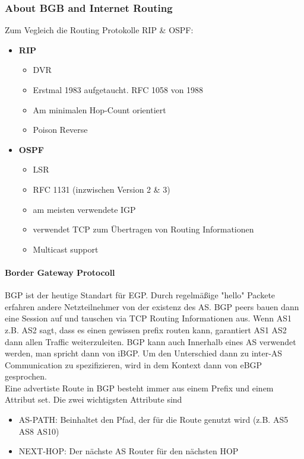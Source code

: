 		\subsubsection{About BGB and Internet Routing}
			Zum Vegleich die Routing Protokolle RIP \& OSPF:
			\begin{itemize}
				\item \textbf{RIP}
				\begin{itemize}
					\item DVR
					\item Erstmal 1983 aufgetaucht. RFC 1058 von 1988
					\item Am minimalen Hop-Count orientiert
					\item Poison Reverse
				\end{itemize}
				\item \textbf{OSPF}
				\begin{itemize}
					\item LSR
					\item RFC 1131 (inzwischen Version 2 \& 3)
					\item am meisten verwendete IGP 
					\item verwendet TCP zum Übertragen von Routing Informationen
					\item Multicast support
				\end{itemize}
			\end{itemize}

			\paragraph{Border Gateway Protocoll}
				BGP ist der heutige Standart für EGP. Durch regelmäßige "hello" Packete erfahren andere Netzteilnehmer von der existenz des AS. BGP peers bauen dann eine Session auf und tauschen via TCP Routing Informationen aus. Wenn AS1 z.B. AS2 sagt, dass es einen gewissen prefix routen kann, garantiert AS1 AS2 dann allen Traffic weiterzuleiten. BGP kann auch Innerhalb eines AS verwendet werden, man spricht dann von iBGP. Um den Unterschied dann zu inter-AS Communication zu spezifizieren, wird in dem Kontext dann von eBGP gesprochen. \\
				Eine advertiste Route in BGP besteht immer aus einem Prefix und einem Attribut set. Die zwei wichtigsten Attribute sind 
				\begin{itemize}
					\item AS-PATH: Beinhaltet den Pfad, der für die Route genutzt wird (z.B. AS5 AS8 AS10)
					\item NEXT-HOP: Der nächste AS Router für den nächsten HOP
				\end{itemize}


